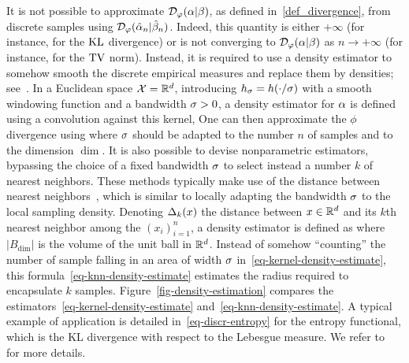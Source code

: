 It is not possible to approximate $\mathcal{D}_\varphi(\alpha|\beta)$, as defined in~\eqref{def_divergence}, from discrete samples using $\mathcal{D}_\varphi(\hat {\alpha}_n|\hat {\beta}_n)$. Indeed, this quantity is either $+\infty$ (for instance, for the $\operatorname{KL}$ divergence) or is not converging to $\mathcal{D}_\varphi(\alpha|\beta)$ as $n \rightarrow +\infty$ (for instance, for the $\operatorname{TV}$ norm).
%
Instead, it is required to use a density estimator to somehow smooth the discrete empirical measures and replace them by densities; see~\citep{silverman1986density}. 
%
In a Euclidean space $\mathcal{X}=\mathbb{R}^d$, introducing $h_\sigma=h(\cdot/\sigma)$ with a smooth windowing function and a bandwidth $\sigma>0$, a density estimator for $\alpha$ is defined using a convolution against this kernel, 
%
One can then approximate the $\phi$ divergence using
where $\sigma$ should be adapted to the number $n$ of samples and to the dimension $\dim$. 
%
It is also possible to devise nonparametric estimators, bypassing the choice of a fixed bandwidth $\sigma$ to select instead a number $k$ of nearest neighbors. These methods typically make use of the distance between nearest neighbors~\citep{loftsgaarden1965nonparametric}, which is similar to locally adapting the bandwidth $\sigma$ to the local sampling density. Denoting $\Delta_k(x)$ the distance between $x \in \mathbb{R}^d$ and its $k$th nearest neighbor among the $(x_i)_{i=1}^n$, a density estimator is defined as
where $|B_\dim|$ is the volume of the unit ball in $\mathbb{R}^d$.
%
Instead of somehow ``counting'' the number of sample falling in an area of width $\sigma$ in~\eqref{eq-kernel-density-estimate}, this formula~\eqref{eq-knn-density-estimate} estimates the radius required to encapsulate $k$ samples. Figure~\ref{fig-density-estimation} compares the estimators~\eqref{eq-kernel-density-estimate} and~\eqref{eq-knn-density-estimate}.
%
A typical example of application is detailed in~\eqref{eq-discr-entropy} for the entropy functional, which is the KL divergence with respect to the Lebesgue measure. We refer to~\citep{BerishaHero} for more details.


\newcommand{\myFigDE}[1]{\texttt{[image: density-estimation/\#1]}}

